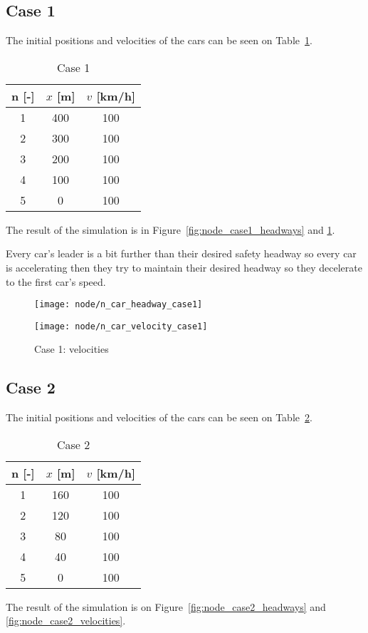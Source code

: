 		\subsection*{Case 1}
		The initial positions and velocities of the cars can be seen on Table~\ref{tab:node_case1}.
		\begin{table}
			\centering
			\begin{tabular}{ |c|c|c| }
				\hline
				n [-] & $x$ [m] & $v$ [km/h]\\
				\hline
				1 & 400 & 100 \\
				2 & 300 & 100 \\
				3 & 200 & 100 \\
				4 & 100 & 100 \\
				5 & 0 & 100 \\
				\hline
			\end{tabular}
			\caption{Case 1}
			\label{tab:node_case1}
		\end{table}
		The result of the simulation is in Figure~\ref{fig:node_case1_headways} and \ref{fig:node_case1_velocities}. 

		Every car's leader is a bit further than their desired safety headway so every car is accelerating then they try to maintain their desired headway so they decelerate to the first car's speed.
		\begin{figure}
			\centering
			\begin{minipage}{.5\textwidth}
				\centering
				\texttt{[image: node/n\_car\_headway\_case1]}
				\caption{Case 1: headways}
				\label{fig:node_case1_headways}
			\end{minipage}\hfill
			\begin{minipage}{.5\textwidth}
				\centering
				\texttt{[image: node/n\_car\_velocity\_case1]}
				\caption{Case 1: velocities}
				\label{fig:node_case1_velocities}
			\end{minipage}
		\end{figure}
		\subsection*{Case 2}
		The initial positions and velocities of the cars can be seen on Table~\ref{tab:node_case2}.
		\begin{table}
			\centering
			\begin{tabular}{ |c|c|c| }
				\hline
				n [-] & $x$ [m] & $v$ [km/h]\\
				\hline
				1 & 160 & 100 \\
				2 & 120 & 100 \\
				3 & 80 & 100 \\
				4 & 40 & 100 \\
				5 & 0 & 100 \\
				\hline
			\end{tabular}
			\caption{Case 2}
			\label{tab:node_case2}
		\end{table}
		The result of the simulation is on Figure~\ref{fig:node_case2_headways} and \ref{fig:node_case2_velocities}. 

